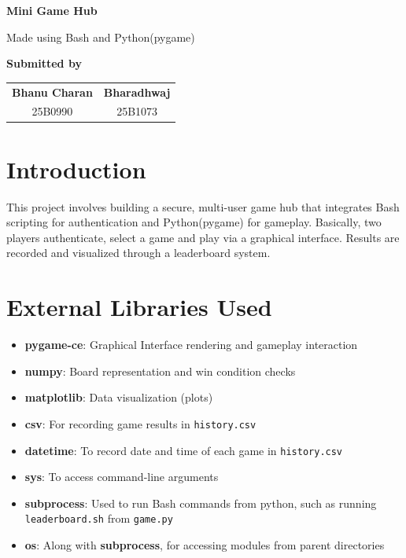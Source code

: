 \documentclass[12pt,a4paper]{article}
\begin{document}
\begin{titlepage}
    \centering
    \vspace*{2cm}
    {\Huge \textbf{Mini Game Hub}\par}
    \vspace{0.5cm}
    {\Large Made using Bash and Python(pygame)\par}
    \vspace{2cm}
    {\Large \textbf{Submitted by}\par}
    \vspace{1cm}
    \begin{tabular}{c c}
    \textbf{Bhanu Charan} & \textbf{Bharadhwaj}
    \\
    25B0990 & 25B1073 \\
    \end{tabular}
    \vfill
\end{titlepage}
\thispagestyle{empty}

\newpage
\tableofcontents
\newpage

\section{Introduction}
This project involves building a secure, multi-user game hub that integrates Bash scripting for authentication and Python(pygame) for gameplay. Basically, two players authenticate, select a game and play via a graphical interface. Results are recorded and visualized through a leaderboard system.

\section{External Libraries Used}
\begin{itemize}
    \item \textbf{pygame-ce}: Graphical Interface rendering and gameplay interaction
    \item \textbf{numpy}: Board representation and win condition checks
    \item \textbf{matplotlib}: Data visualization (plots)
    \item \textbf{csv}: For recording game results in \texttt{history.csv}
    \item \textbf{datetime}: To record date and time of each game in \texttt{history.csv}
    \item \textbf{sys}: To access command-line arguments
    \item \textbf{subprocess}: Used to run Bash commands from python, such as running \texttt{leaderboard.sh} from \texttt{game.py}
    \item \textbf{os}: Along with \textbf{subprocess}, for accessing modules from parent directories
    
\end{itemize}
\end{document}
